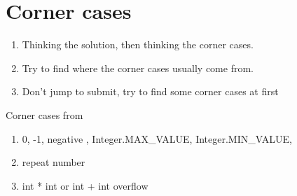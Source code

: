 \section{Corner cases}

\begin{enumerate}
    \item Thinking the solution, then thinking the corner cases.
    \item Try to find where the corner cases usually come from.
    \item Don't jump to submit, try to find some corner cases at first
\end{enumerate}

Corner cases from

\begin{enumerate}
    \item  0, -1, negative , Integer.MAX\_VALUE, Integer.MIN\_VALUE,
    \item  repeat number
    \item  int * int or int + int overflow
\end{enumerate}


